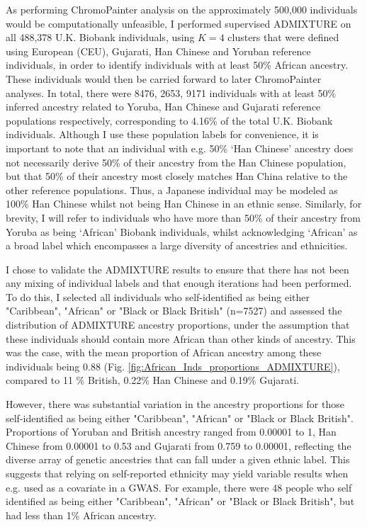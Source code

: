 As performing ChromoPainter analysis on the approximately 500,000 individuals would be computationally unfeasible, I performed supervised ADMIXTURE on all 488,378 U.K. Biobank individuals, using $K=4$ clusters that were defined using European (CEU), Gujarati, Han Chinese and Yoruban reference individuals, in order to identify individuals with at least 50\% African ancestry. These individuals would then be carried forward to later ChromoPainter analyses. In total, there were 8476, 2653, 9171 individuals with at least 50\% inferred ancestry related to Yoruba, Han Chinese and Gujarati reference populations respectively, corresponding to 4.16\% of the total U.K. Biobank individuals. Although I use these population labels for convenience, it is important to note that an individual with e.g. 50\% `Han Chinese' ancestry does not necessarily derive 50\% of their ancestry from the Han Chinese population, but that 50\% of their ancestry most closely matches Han China relative to the other reference populations. Thus, a Japanese individual may be modeled as 100\% Han Chinese whilst not being Han Chinese in an ethnic sense. Similarly, for brevity, I will refer to individuals who have more than 50\% of their ancestry from Yoruba as being `African' Biobank individuals, whilst acknowledging `African' as a broad label which encompasses a large diversity of ancestries and ethnicities.  

I chose to validate the ADMIXTURE results to ensure that there has not been any mixing of individual labels and that enough iterations had been performed. To do this, I selected all individuals who self-identified as being either "Caribbean", "African" or "Black or Black British" (n=7527) and assessed the distribution of ADMIXTURE ancestry proportions, under the assumption that these individuals should contain more African than other kinds of ancestry. This was the case, with the mean proportion of African ancestry among these individuals being 0.88 (Fig. \ref{fig:African_Inds_proportions_ADMIXTURE}), compared to 11 \% British, 0.22\% Han Chinese and 0.19\% Gujarati.

However, there was substantial variation in the ancestry proportions for those self-identified as being either "Caribbean", "African" or "Black or Black British". Proportions of Yoruban and British ancestry ranged from 0.00001 to 1, Han Chinese from 0.00001 to 0.53 and Gujarati from 0.759 to 0.00001, reflecting the diverse array of genetic ancestries that can fall under a given ethnic label. This suggests that relying on self-reported ethnicity may yield variable results when e.g. used as a covariate in a GWAS. For example, there were 48 people who self identified as being either "Caribbean", "African" or "Black or Black British", but had less than 1\% African ancestry.

